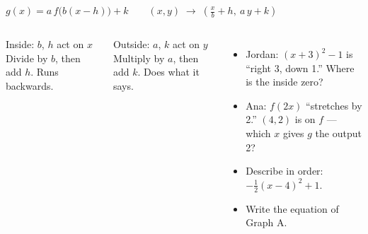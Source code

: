 \documentclass[aspectratio=169, 11pt]{beamer}
\begin{document}
\begin{frame}[t, plain]

  \begin{center}
    {\Large \(g(x) = a\,f\big(b(x - h)\big) + k \qquad (x, y) \;\longrightarrow\; \left(\tfrac{x}{b} + h,\ a\,y + k\right)\)}
  \end{center}

  \medskip
  \begin{columns}[T]
      \begin{block}{Inside: \(b\), \(h\) act on \(x\)}
        Divide by \(b\), then add \(h\). Runs backwards.
      \end{block}
      \smallskip
      \begin{block}{Outside: \(a\), \(k\) act on \(y\)}
        Multiply by \(a\), then add \(k\). Does what it says.
      \end{block}

      \begin{itemize}\setlength{\itemsep}{6pt}
        \item Jordan: \((x + 3)^2 - 1\) is ``right 3, down 1.'' Where is the inside zero?
        \item Ana: \(f(2x)\) ``stretches by 2.'' \((4, 2)\) is on \(f\) --- which \(x\) gives
              \(g\) the output 2?
        \item Describe in order: \(-\tfrac{1}{2}(x - 4)^2 + 1\).
        \item Write the equation of Graph A.
      \end{itemize}
  \end{columns}
\end{frame}
\end{document}
